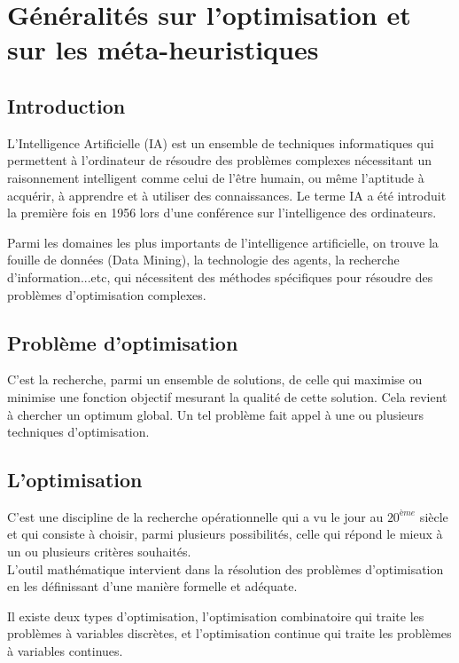 \chapter{Généralités sur l'optimisation et sur les méta-heuristiques}

\section*{Introduction}

L'Intelligence Artificielle (IA) est un ensemble de techniques
informatiques qui permettent à l'ordinateur de résoudre des problèmes
complexes nécessitant un raisonnement intelligent comme celui de
l'être humain, ou même l'aptitude à acquérir, à apprendre et à utiliser des
connaissances. Le terme IA a été introduit la première fois en 1956 lors
d'une conférence sur l'intelligence des ordinateurs.

Parmi les domaines les plus importants de l'intelligence artificielle, on
trouve la fouille de données (Data Mining), la technologie des agents, la
recherche d'information...etc, qui nécessitent des méthodes spécifiques pour résoudre des problèmes d'optimisation complexes.

\section{Problème d'optimisation}
C'est la recherche, parmi un ensemble de solutions, de celle qui maximise ou minimise une fonction objectif mesurant la qualité de cette solution. Cela revient à chercher un optimum global. Un tel problème fait appel à une ou plusieurs techniques d'optimisation.

\section{L'optimisation}
C'est une discipline de la recherche opérationnelle qui a vu le jour au $20^{ème}$ siècle et qui consiste à choisir, parmi plusieurs possibilités, celle qui répond le mieux à un ou plusieurs critères souhaités.\\

L'outil mathématique intervient dans la résolution des problèmes d'optimisation en les définissant d'une manière formelle et adéquate. 

Il existe deux types d'optimisation, l'optimisation combinatoire qui traite les problèmes à variables discrètes, et l'optimisation continue qui traite les problèmes à variables continues. 

